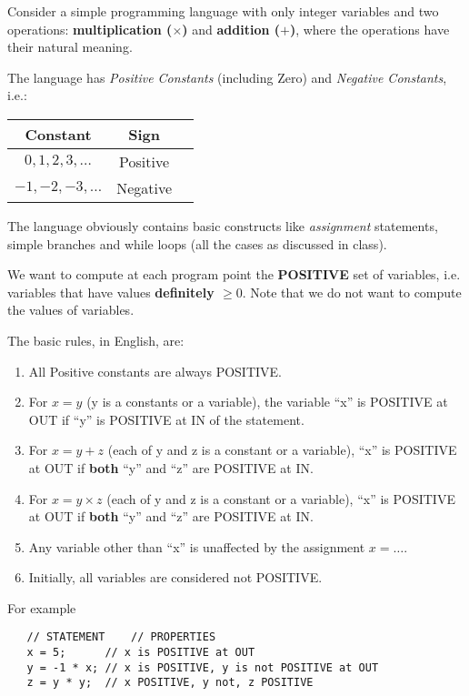 \documentclass[12pt]{article}
\begin{document}
\begin{enumerate}
  Consider a simple programming language with only integer
  variables and two operations:  {\bf multiplication
    ($\times$)} and {\bf addition ($+$)}, where the operations
  have their natural meaning. 

  The language has {\em Positive Constants} (including Zero) and
  {\em Negative Constants}, i.e.:
  \begin{center}
    \begin{tabular}{|c|c|c|} \hline
      {\bf Constant} & {\bf Sign} \\ \hline \hline
      $0, 1, 2, 3, \ldots$ & Positive \\ \hline
      $-1, -2, -3, \ldots$ & Negative \\ \hline
    \end{tabular}
  \end{center}

  The language obviously contains basic constructs like
  {\em assignment} statements, simple branches and while loops
  (all the cases as discussed in class).
  
  We want to compute at each program point the {\bf POSITIVE}
  set of variables, i.e. variables that have values
  {\bf definitely $\geq 0$}. Note that we do not want to compute
  the values of variables.

  The basic rules, in English, are:
  \begin{enumerate}
  \item All Positive constants are always POSITIVE.
  \item  For $x = y$ (y is a constants or a variable), the
    variable ``x'' is POSITIVE at OUT if ``y'' is POSITIVE at
    IN of the statement.
  \item For $x = y + z$ (each of y and z is a  constant or a
    variable), ``x'' is POSITIVE at OUT if {\bf both} ``y'' and ``z''
    are POSITIVE at IN.
  \item For $x = y \times z$ (each of y and z is a  constant or a
    variable), ``x'' is POSITIVE at OUT if {\bf both} ``y'' and ``z''
    are POSITIVE at IN.
  \item Any variable other than ``x'' is unaffected by the
    assignment $x = \ldots$.
  \item Initially, all variables are considered  not  POSITIVE.
  \end{enumerate}

For example
\begin{verbatim}
   // STATEMENT    // PROPERTIES  
   x = 5;      // x is POSITIVE at OUT
   y = -1 * x; // x is POSITIVE, y is not POSITIVE at OUT
   z = y * y;  // x POSITIVE, y not, z POSITIVE


\end{verbatim}
\end{enumerate}
\end{document}
